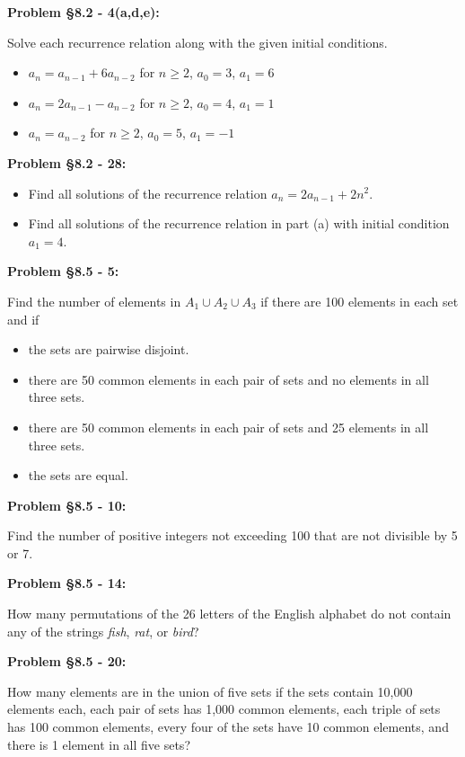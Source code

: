 \documentclass{article}
\newenvironment{problem}[1]
    {\begin{mdframed}[default]
    \textbf{Problem #1:}
    }
    {\end{mdframed}
    }
\begin{document}
\begin{problem}{\S 8.2 - 4(a,d,e)}
Solve each recurrence relation along with the given initial conditions.
\begin{itemize}
    \item[(a)] $a_n = a_{n-1} + 6a_{n-2}$ for $n \geq 2$, $a_0 = 3$, $a_1 = 6$
    \item[(d)] $a_n = 2a_{n-1} - a_{n-2}$ for $n \geq 2$, $a_0 = 4$, $a_1 = 1$
    \item[(e)] $a_n = a_{n-2}$ for $n \geq 2$, $a_0 = 5$, $a_1 = -1$
\end{itemize}
\end{problem}


\begin{problem}{\S 8.2 - 28}
\begin{itemize}
    \item[(a)] Find all solutions of the recurrence relation $a_n = 2a_{n-1} + 2n^2$.
    \item[(b)] Find all solutions of the recurrence relation in part (a) with initial condition $a_1 = 4$.
\end{itemize}
\end{problem}


\begin{problem}{\S 8.5 - 5}
Find the number of elements in $A_1 \cup A_2 \cup A_3$ if there are 100 elements in each set and if
\begin{itemize}
    \item[(a)] the sets are pairwise disjoint.
    \item[(b)] there are 50 common elements in each pair of sets and no elements in all three sets.
    \item[(c)] there are 50 common elements in each pair of sets and 25 elements in all three sets.
    \item[(d)] the sets are equal.
\end{itemize}
\end{problem}


\begin{problem}{\S 8.5 - 10}
Find the number of positive integers not exceeding 100 that are not divisible by 5 or 7.
\end{problem}


\begin{problem}{\S 8.5 - 14}
How many permutations of the 26 letters of the English alphabet do not contain any of the strings \emph{fish}, \emph{rat}, or \emph{bird}?
\end{problem}


\begin{problem}{\S 8.5 - 20}
How many elements are in the union of five sets if the sets contain 10,000 elements each, each pair of sets has 1,000 common elements, each triple of sets has 100 common elements, every four of the sets have 10 common elements, and there is 1 element in all five sets?
\end{problem}
\end{document}
